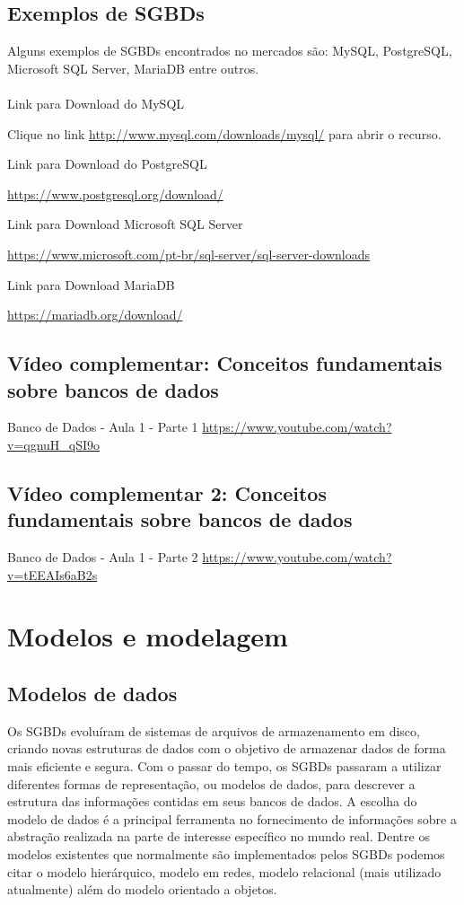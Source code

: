 \documentclass{article}
\begin{document}
\subsection*{Exemplos de SGBDs}
Alguns exemplos de SGBDs encontrados no mercados são: MySQL, PostgreSQL, Microsoft SQL Server, MariaDB entre outros.
\\
\\
Link para Download do MySQL

Clique no link \href{http://www.mysql.com/downloads/mysql/}{http://www.mysql.com/downloads/mysql/} para abrir o recurso.

Link para Download do PostgreSQL

\href{https://www.postgresql.org/download/}{https://www.postgresql.org/download/}

Link para Download Microsoft SQL Server

\href{https://www.microsoft.com/pt-br/sql-server/sql-server-downloads}{https://www.microsoft.com/pt-br/sql-server/sql-server-downloads}

Link para Download MariaDB

\href{https://mariadb.org/download/}{https://mariadb.org/download/}

\subsection{Vídeo complementar: Conceitos fundamentais sobre bancos de dados}

Banco de Dados - Aula 1 - Parte 1
\href{https://www.youtube.com/watch?v=qgnuH_qSI9o}{https://www.youtube.com/watch?v=qgnuH_qSI9o}

\subsection{Vídeo complementar 2: Conceitos fundamentais sobre bancos de dados}

Banco de Dados - Aula 1 - Parte 2
\href{https://www.youtube.com/watch?v=tEEAIs6aB2s}{https://www.youtube.com/watch?v=tEEAIs6aB2s}

\section{Modelos e modelagem}
\subsection{Modelos de dados}
Os SGBDs evoluíram de sistemas de arquivos de armazenamento em disco, criando novas estruturas de dados com o objetivo de armazenar dados de forma mais eficiente e segura. Com o passar do tempo, os SGBDs passaram a utilizar diferentes formas de representação, ou modelos de dados, para descrever a estrutura das informações contidas em seus bancos de dados. A escolha do modelo de dados é a principal ferramenta no fornecimento de informações sobre a abstração realizada na parte de interesse específico no mundo real. Dentre os modelos existentes que normalmente são implementados pelos SGBDs podemos citar o modelo hierárquico, modelo em redes, modelo relacional (mais utilizado atualmente) além do modelo orientado a objetos.
\end{document}
